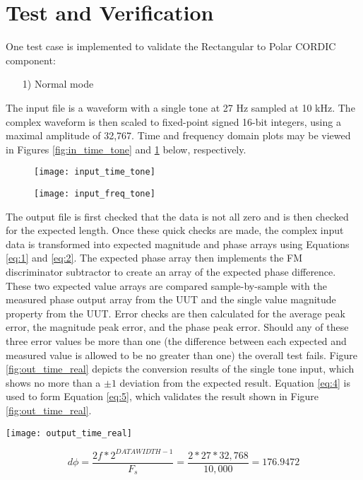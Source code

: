 \documentclass{article}
\def\Comp{Rectangular to Polar CORDIC}
\begin{document}
\section*{Test and Verification}
	One test case is implemented to validate the \Comp{} component:
	\begin{itemize}
		\item[1)] Normal mode
	\end{itemize}
	The input file is a waveform with a single tone at 27 Hz sampled at 10 kHz. The complex waveform is then scaled to fixed-point signed 16-bit integers, using a maximal amplitude of 32,767. Time and frequency domain plots may be viewed in Figures \ref{fig:in_time_tone} and \ref{fig:in_freq_tone} below, respectively.\par\medskip
	\begin{figure}[ht]
	\centering
	\begin{minipage}{.5\textwidth}
		\centering\texttt{[image: input\_time\_tone]}
		\label{fig:in_time_tone}
	\end{minipage}%
	\begin{minipage}{.5\textwidth}
		\centering\texttt{[image: input\_freq\_tone]}
		\label{fig:in_freq_tone}
	\end{minipage}
\end{figure}
	\noindent The output file is first checked that the data is not all zero and is then checked for the expected length. Once these quick checks are made, the complex input data is transformed into expected magnitude and phase arrays using Equations \ref{eq:1} and \ref{eq:2}. The expected phase array then implements the FM discriminator subtractor to create an array of the expected phase difference. These two expected value arrays are compared sample-by-sample with the measured phase output array from the UUT and the single value magnitude property from the UUT. Error checks are then calculated for the average peak error, the magnitude peak error, and the phase peak error. Should any of these three error values be more than one (the difference between each expected and measured value is allowed to be no greater than one) the overall test fails. Figure \ref{fig:out_time_real} depicts the conversion results of the single tone input, which shows no more than a $\pm1$ deviation from the expected result. Equation \ref{eq:4} is used to form Equation \ref{eq:5}, which validates the result shown in Figure \ref{fig:out_time_real}.

{\centering\captionsetup{type=figure}\texttt{[image: output\_time\_real]}\par{}\label{fig:out_time_real}}

\begin{equation} \label{eq:5}
	d\phi = \frac{2f*2^{DATAWIDTH-1}}{F_s} = \frac{2*27*32,768}{10,000} = 176.9472
\end{equation}
\end{document}
